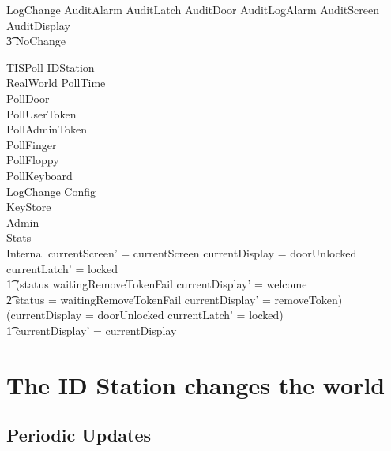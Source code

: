 \begin{zed}
        LogChange  AuditAlarm \lor AuditLatch \lor AuditDoor
        \lor AuditLogAlarm \lor AuditScreen \lor AuditDisplay 
\\ \t3 \lor NoChange
\end{zed} %


\begin{schema}{TISPoll}
	\Delta IDStation
\\      \Xi RealWorld
\also
	PollTime
\\      PollDoor
\\	PollUserToken
\\	PollAdminToken
\\	PollFinger
\\      PollFloppy
\\      PollKeyboard
\\      LogChange
\also
        \Xi Config
\\      \Xi KeyStore
\\      \Xi Admin
\\      \Xi Stats
\\      \Xi Internal
\where
        currentScreen' = currentScreen
\also
        currentDisplay = doorUnlocked \land
        currentLatch' = locked
\\ \t1 \land        (status \neq waitingRemoveTokenFail \land
        currentDisplay' = welcome
\\ \t2 \lor status = waitingRemoveTokenFail \land currentDisplay' =
removeToken)
\\      \lor
        \lnot (currentDisplay = doorUnlocked \land currentLatch' =
        locked)
\\ \t1  \land currentDisplay' = currentDisplay
\end{schema}

\section{The ID Station changes the world}

\subsection{Periodic Updates}

